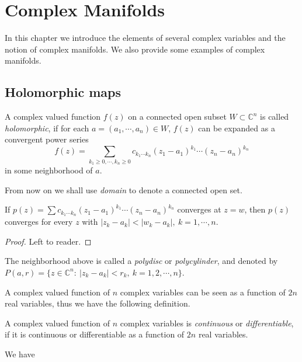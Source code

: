 \chapter{Complex Manifolds}

In this chapter we introduce the elements of several complex variables and the notion of complex manifolds.
We also provide some examples of complex ma\-nifolds.

\section{Holomorphic maps}

\begin{defn}
    A complex valued function $f(z)$ on a connected open subset $W\subset\mathbb{C}^n$ is called \emph{holomorphic}, if for each $a=(a_1,\cdots,a_n)\in W$, $f(z)$ can be expanded as a convergent power series
    \[f(z)=\sum_{k_1\geq 0,\cdots,k_n\geq 0}c_{k_1\cdots k_n}(z_1-a_1)^{k_1}\cdots(z_n-a_n)^{k_n}\]
    in some neighborhood of $a$.
\end{defn}

From now on we shall use \emph{domain} to denote a connected open set.

\begin{prop}
    If $p(z)=\sum c_{k_1\cdots k_n}(z_1-a_1)^{k_1}\cdots(z_n-a_n)^{k_n}$ converges at $z=w$, then $p(z)$ converges for every $z$ with $|z_k-a_k|<|w_k-a_k|,\ k=1,\cdots,n$.
\end{prop}
\begin{proof}
    Left to reader.
\end{proof}

\begin{defn}
    The neighborhood above is called a \emph{polydisc} or \emph{polycylinder}, and denoted by $P(a,r)=\{z\in\mathbb{C}^n:\ |z_k-a_k|<r_k,\ k=1,2,\cdots,n\}$.
\end{defn}

A complex valued function of $n$ complex variables can be seen as a function of $2n$ real variables, thus we have the following definition.
\begin{defn}
    A complex valued function of $n$ complex variables is \emph{continuous} or \emph{differentiable}, if it is continuous or differentiable as a function of $2n$ real variables.
\end{defn}

We have

